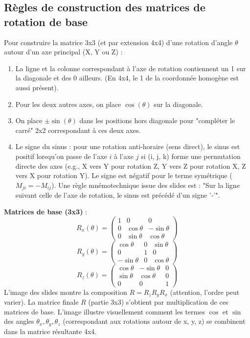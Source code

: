 \subsection{Règles de construction des matrices de rotation de base}
Pour construire la matrice 3x3 (et par extension 4x4) d'une rotation d'angle \( \theta \) autour d'un axe principal (X, Y ou Z) :
\begin{enumerate}
    \item La ligne et la colonne correspondant à l'axe de rotation contiennent un 1 sur la diagonale et des 0 ailleurs. (En 4x4, le 1 de la coordonnée homogène est aussi présent).
    \item Pour les deux autres axes, on place \( \cos(\theta) \) sur la diagonale.
    \item On place \( \pm \sin(\theta) \) dans les positions hors diagonale pour "compléter le carré" 2x2 correspondant à ces deux axes.
    \item Le signe du sinus : pour une rotation anti-horaire (sens direct), le sinus est positif lorsqu'on passe de l'axe \( i \) à l'axe \( j \) si (i, j, k) forme une permutation directe des axes (e.g., X vers Y pour rotation Z, Y vers Z pour rotation X, Z vers X pour rotation Y). Le signe est négatif pour le terme symétrique (\( M_{ji} = -M_{ij} \)). Une règle mnémotechnique issue des slides est : "Sur la ligne suivant celle de l'axe de rotation, le sinus est précédé d'un signe '-'".
\end{enumerate}
\textbf{Matrices de base (3x3)} :
\[ R_x(\theta) = \begin{pmatrix} 1 & 0 & 0 \\ 0 & \cos \theta & -\sin \theta \\ 0 & \sin \theta & \cos \theta \end{pmatrix} \]
\[ R_y(\theta) = \begin{pmatrix} \cos \theta & 0 & \sin \theta \\ 0 & 1 & 0 \\ -\sin \theta & 0 & \cos \theta \end{pmatrix} \]
\[ R_z(\theta) = \begin{pmatrix} \cos \theta & -\sin \theta & 0 \\ \sin \theta & \cos \theta & 0 \\ 0 & 0 & 1 \end{pmatrix} \]
L'image des slides montre la composition \( R = R_z R_y R_x \) (attention, l'ordre peut varier).
La matrice finale \( R \) (partie 3x3) s'obtient par multiplication de ces matrices de base. L'image illustre visuellement comment les termes \( \cos \) et \( \sin \) des angles \( \theta_x, \theta_y, \theta_z \) (correspondant aux rotations autour de x, y, z) se combinent dans la matrice résultante 4x4.
